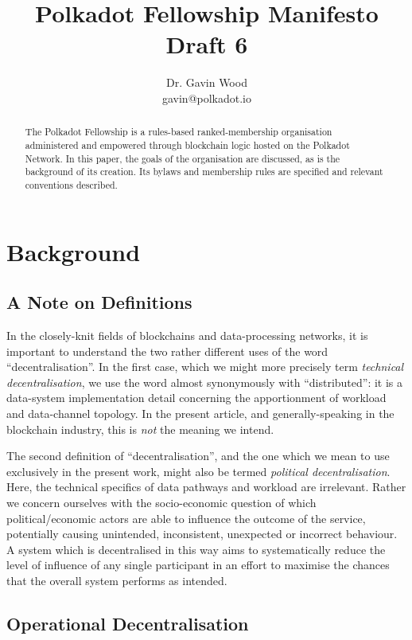 \documentclass[9pt,oneside]{amsart}
\title{Polkadot Fellowship Manifesto \\ {\smaller \textbf{Draft 6}}}
\author{ Dr. Gavin Wood\\ gavin@polkadot.io}
\begin{document}
\begin{abstract}

The Polkadot Fellowship is a rules-based ranked-membership organisation administered and empowered through blockchain logic hosted on the Polkadot Network. In this paper, the goals of the organisation are discussed, as is the background of its creation. Its bylaws and membership rules are specified and relevant conventions described.

\end{abstract}

\maketitle

\section{Background}\label{background}

\subsection{A Note on Definitions}

In the closely-knit fields of blockchains and data-processing networks, it is important to understand the two rather different uses of the word ``decentralisation''. In the first case, which we might more precisely term \emph{technical decentralisation}, we use the word almost synonymously with ``distributed'': it is a data-system implementation detail concerning the apportionment of workload and data-channel topology. In the present article, and generally-speaking in the blockchain industry, this is \emph{not} the meaning we intend.

The second definition of ``decentralisation'', and the one which we mean to use exclusively in the present work, might also be termed \emph{political decentralisation}. Here, the technical specifics of data pathways and workload are irrelevant. Rather we concern ourselves with the socio-economic question of which political/economic actors are able to influence the outcome of the service, potentially causing unintended, inconsistent, unexpected or incorrect behaviour. A system which is decentralised in this way aims to systematically reduce the level of influence of any single participant in an effort to maximise the chances that the overall system performs as intended.

\subsection{Operational Decentralisation}
\end{document}
